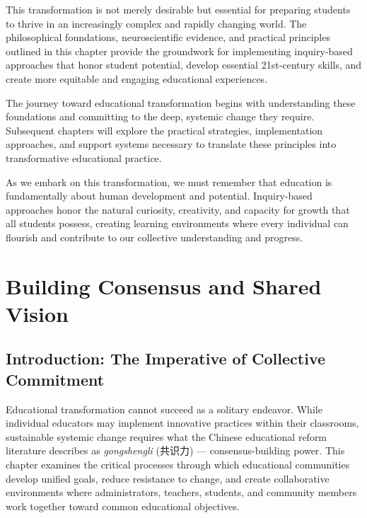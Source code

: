 \documentclass[
  Letterpaper,
]{scrbook}
\begin{document}
This transformation is not merely desirable but essential for preparing
students to thrive in an increasingly complex and rapidly changing
world. The philosophical foundations, neuroscientific evidence, and
practical principles outlined in this chapter provide the groundwork for
implementing inquiry-based approaches that honor student potential,
develop essential 21st-century skills, and create more equitable and
engaging educational experiences.

The journey toward educational transformation begins with understanding
these foundations and committing to the deep, systemic change they
require. Subsequent chapters will explore the practical strategies,
implementation approaches, and support systems necessary to translate
these principles into transformative educational practice.

As we embark on this transformation, we must remember that education is
fundamentally about human development and potential. Inquiry-based
approaches honor the natural curiosity, creativity, and capacity for
growth that all students possess, creating learning environments where
every individual can flourish and contribute to our collective
understanding and progress.


\chapter{Building Consensus and Shared
Vision}\label{building-consensus-and-shared-vision}

\section{Introduction: The Imperative of Collective
Commitment}\label{introduction-the-imperative-of-collective-commitment}

Educational transformation cannot succeed as a solitary endeavor. While
individual educators may implement innovative practices within their
classrooms, sustainable systemic change requires what the Chinese
educational reform literature describes as \emph{gongshengli} (共识力)
--- consensus-building power. This chapter examines the critical
processes through which educational communities develop unified goals,
reduce resistance to change, and create collaborative environments where
administrators, teachers, students, and community members work together
toward common educational objectives.
\end{document}
